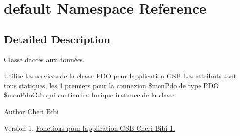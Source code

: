 \hypertarget{namespacedefault}{}\section{default Namespace Reference}
\label{namespacedefault}


\subsection{Detailed Description}
Classe d\textquotesingle{}accès aux données.

Utilise les services de la classe P\+DO pour l\textquotesingle{}application G\+SB Les attributs sont tous statiques, les 4 premiers pour la connexion \$mon\+Pdo de type P\+DO \$mon\+Pdo\+Gsb qui contiendra l\textquotesingle{}unique instance de la classe

\begin{DoxyAuthor}{Author}
Cheri Bibi 
\end{DoxyAuthor}
\begin{DoxyVersion}{Version}
1. \hyperlink{variables__0_8js_abebe2f9f71b23f75cd6b071ecb52edde}{Fonctions pour l\textquotesingle{}application G\+SB  Cheri Bibi  1. }
\end{DoxyVersion}
